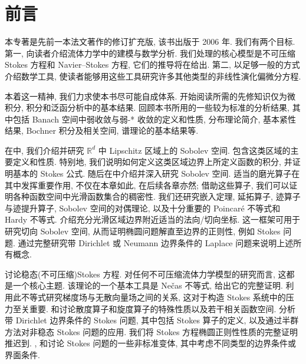\section*{前言}
\label{frontmatter:preface}

本专著是先前一本法文著作的修订扩充版, 该书出版于 2006 年. 我们有两个目标. 第一, 向读者介绍流体力学中的建模与数学分析. 我们处理的核心模型是不可压缩 Stokes 方程和 Navier--Stokes 方程, 它们的推导将在给出. 第二, 以足够一般的方式介绍数学工具, 使读者能够用这些工具研究许多其他类型的非线性演化偏微分方程.

本着这一精神, 我们力求使本书尽可能自成体系. 开始阅读所需的先修知识仅为微积分, 积分和泛函分析中的基本结果. 回顾本书所用的一些较为标准的分析结果, 其中包括 Banach 空间中弱收敛与弱-* 收敛的定义和性质, 分布理论简介, 基本紧性结果, Bochner 积分及相关空间, 谱理论的基本结果等.

在中, 我们介绍并研究 $\mathbb{R}^d$ 中 Lipschitz 区域上的 Sobolev 空间. 包含这类区域的主要定义和性质. 特别地, 我们说明如何定义这类区域边界上所定义函数的积分, 并证明基本的 Stokes 公式. 随后在中介绍并深入研究 Sobolev 空间. 适当的磨光算子在其中发挥重要作用, 不仅在本章如此, 在后续各章亦然; 借助这些算子, 我们可以证明各种函数空间中光滑函数集合的稠密性. 我们还研究嵌入定理, 延拓算子, 迹算子与迹提升算子, Sobolev 空间的对偶理论, 以及十分重要的 Poincaré 不等式和 Hardy 不等式. 介绍充分光滑区域边界附近适当的法向/切向坐标. 这一框架可用于研究切向 Sobolev 空间, 从而证明椭圆问题解直至边界的正则性, 例如 Stokes 问题. 通过完整研究带 Dirichlet 或 Neumann 边界条件的 Laplace 问题来说明上述所有概念.

讨论稳态(不可压缩)Stokes 方程. 对任何不可压缩流体力学模型的研究而言, 这都是一个核心主题. 该理论的一个基本工具是 Nečas 不等式, 给出它的完整证明. 利用此不等式研究梯度场与无散向量场之间的关系, 这对于构造 Stokes 系统中的压力至关重要. 和讨论散度算子和旋度算子的特殊性质以及若干相关函数空间. 分析带 Dirichlet 边界条件的 Stokes 问题, 其中包括 Stokes 算子的定义, 以及通过半群方法对非稳态 Stokes 问题的应用. 我们将 Stokes 方程椭圆正则性性质的完整证明推迟到. , 和讨论 Stokes 问题的一些非标准变体, 其中考虑不同类型的边界条件或界面条件.

